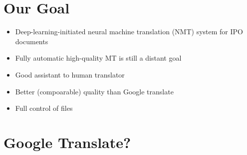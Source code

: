 \documentclass[11pt]{article}
\providecommand{\tightlist}{%
      \setlength{\itemsep}{0pt}\setlength{\parskip}{0pt}}
\begin{document}
    \section{Our Goal}\label{our-goal}

\begin{itemize}
\tightlist
\item
  Deep-learning-initiated neural machine translation (NMT) system for
  IPO documents
\end{itemize}

    \begin{itemize}
\tightlist
\item
  Fully automatic high-quality MT is still a distant goal 
\item
  Good assistant to human translator
\item
   Better (compoarable) quality than Google translate
\item
  Full control of files
\end{itemize}

    \section{Google Translate?}\label{google-translate}
\end{document}
